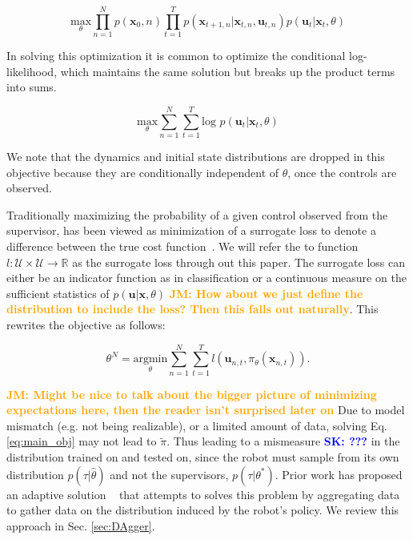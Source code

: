 \documentclass[10pt, conference]{ieeeconf}      %
\newcommand{\bu}{\mathbf{u}}
\newcommand{\bx}{\mathbf{x}}
\newcommand{\sknote}[1]{%
 {\textcolor{blue}{\textbf{SK: #1}}}{}}
\newcommand{\jmnote}[1]{%
 {\textcolor{orange}{\textbf{JM: #1}}}{}}
\begin{document}
$$\underset{\theta}{\mbox{max}} \prod^N_{n=1} p(\bx_0,n) \prod^T_{t=1} p(\bx_{t+1,n}|\bx_{t,n},\bu_{t,n})p(\bu_t|\bx_t,\theta)$$

In solving this optimization it is common to optimize the conditional log-likelihood, which maintains the same solution but breaks up the product terms into sums. 

\begin{equation}\label{eq:m_likeli_obj}
\underset{\theta}{\mbox{max}} \sum^N_{n=1}\sum^T_{t=1}\mbox{log }p(\bu_t|\bx_t,\theta)
\end{equation}


We note that the dynamics and initial state distributions are dropped in this objective because they are conditionally independent of $\theta$, once the controls are observed. 

 Traditionally maximizing the probability of a given control observed from the supervisor, has been viewed as minimization of a surrogate loss to denote a difference between the true cost function~\cite{ross2010reduction,ross2010efficient}. We will refer the to function $l : \mathcal{U} \times \mathcal{U} \rightarrow \mathbb{R}$ as the surrogate loss through out this paper. The surrogate loss can either be an indicator function as in classification or a continuous measure on the sufficient statistics of $p(\bu|\bx,\theta)$ \jmnote{How about we just define the distribution to include the loss? Then this falls out naturally}.  This rewrites the objective as follows: 

\begin{equation}\label{eq:main_obj}
\theta^N = \underset{\theta}{\mbox{argmin}} \sum^N_{n=1}\sum^T_{t=1} l(\bu_{n,t}, \pi_{\theta} (\bx_{n,t})).
\end{equation}

\jmnote{Might be nice to talk about the bigger picture of minimizing expectations here, then the reader isn't surprised later on}
Due to model mismatch (e.g. not being realizable), or a limited amount of data, solving Eq. \ref{eq:main_obj} may not lead to $\tilde{\pi}$.  Thus leading to a mismeasure \sknote{???} in the distribution trained on and tested on, since the robot must sample from its own distribution $p(\tau|\hat{\theta})$ and not the supervisors, $p(\tau|\theta^*)$.  Prior work has proposed an adaptive solution ~\cite{ross2010reduction} that attempts to solves this problem by aggregating data to gather data on the distribution induced by the robot's policy. We review this approach in Sec. \ref{sec:DAgger}. 
\end{document}
